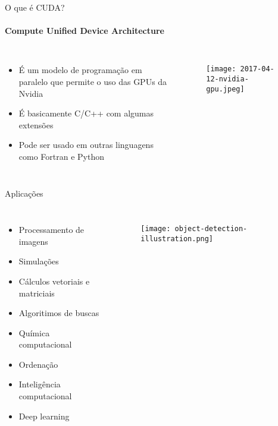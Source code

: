 \begin{frame}[t]{O que é CUDA?}
    \framesubtitle{Compute Unified Device Architecture}
    \begin{columns}
            \Large
            \begin{itemize}
                \item É um modelo de programação em paralelo que permite o uso das GPUs da Nvidia
                \item É basicamente C/C++ com algumas extensões
                \item Pode ser usado em outras linguagens como Fortran e Python 
            \end{itemize}
            \begin{figure}
                \texttt{[image: 2017-04-12-nvidia-gpu.jpeg]}
            \end{figure}  
    \end{columns}
\end{frame}
\begin{frame}[t]{Aplicações}
    \begin{columns}
            \Large
            \begin{itemize}
                \item Processamento de imagens
                \item Simulações
                \item Cálculos vetoriais e matriciais
                \item Algoritimos de buscas
                \item Química computacional
                \item Ordenação
                \item Inteligência computacional
                \item Deep learning
            \end{itemize}
            \begin{figure}
                \texttt{[image: object-detection-illustration.png]}
            \end{figure}  
    \end{columns}
\end{frame}
